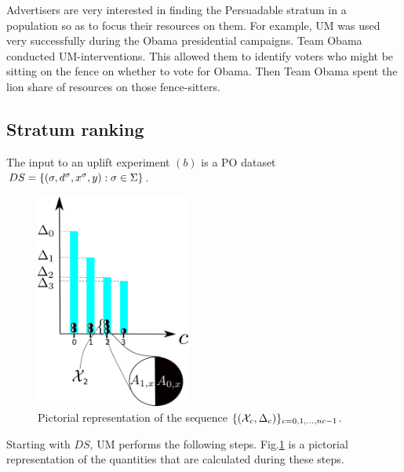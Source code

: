 Advertisers are very interested in finding
the Persuadable stratum in a population
so as to focus their resources on them.
For example, UM was used very
successfully during the 
Obama presidential campaigns. 
Team Obama conducted UM-interventions.
This allowed them to
identify voters who might be sitting on the fence
on whether to vote for Obama.
Then Team Obama spent
the lion share
of  resources  on those
fence-sitters.



\subsection{Stratum ranking}
\label{sec-up-ranking}

The input
to an uplift experiment $(b)$ is a PO
dataset $DS= \{ (\sigma, d^\sigma, x^\sigma,  y):
 \sigma\in\Sigma\}$.
 
\begin{figure}[h!]
\centering
\includegraphics[width=2in]
{uplift/uplift-bins-up.png}
\caption{
Pictorial
representation
of the sequence
$\{({\cal X}_c, \Delta_c)\}_{c=0, 1, \ldots, nc-1}$.
}
\label{fig-uplift-bins}
\end{figure}


Starting with $DS$,
UM performs the following steps.
Fig.\ref{fig-uplift-bins}
is a pictorial representation
of the quantities
that are calculated
during these steps.

